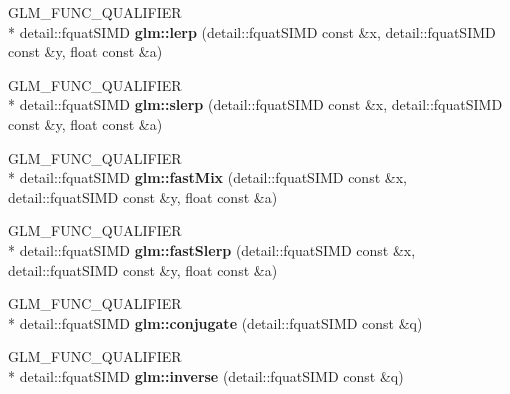 \begin{DoxyCompactItemize}
\item 
\hypertarget{namespaceglm_a4d8cd3fe0165431fb1c54cbeb432bf26}{G\-L\-M\-\_\-\-F\-U\-N\-C\-\_\-\-Q\-U\-A\-L\-I\-F\-I\-E\-R \\*
detail\-::fquat\-S\-I\-M\-D {\bfseries glm\-::lerp} (detail\-::fquat\-S\-I\-M\-D const \&x, detail\-::fquat\-S\-I\-M\-D const \&y, float const \&a)}\label{namespaceglm_a4d8cd3fe0165431fb1c54cbeb432bf26}

\item 
\hypertarget{namespaceglm_a40d5134f42aaa1511518d2abe97e0ebc}{G\-L\-M\-\_\-\-F\-U\-N\-C\-\_\-\-Q\-U\-A\-L\-I\-F\-I\-E\-R \\*
detail\-::fquat\-S\-I\-M\-D {\bfseries glm\-::slerp} (detail\-::fquat\-S\-I\-M\-D const \&x, detail\-::fquat\-S\-I\-M\-D const \&y, float const \&a)}\label{namespaceglm_a40d5134f42aaa1511518d2abe97e0ebc}

\item 
\hypertarget{namespaceglm_acf0fe775efd8a75dc6dc603efd157231}{G\-L\-M\-\_\-\-F\-U\-N\-C\-\_\-\-Q\-U\-A\-L\-I\-F\-I\-E\-R \\*
detail\-::fquat\-S\-I\-M\-D {\bfseries glm\-::fast\-Mix} (detail\-::fquat\-S\-I\-M\-D const \&x, detail\-::fquat\-S\-I\-M\-D const \&y, float const \&a)}\label{namespaceglm_acf0fe775efd8a75dc6dc603efd157231}

\item 
\hypertarget{namespaceglm_a57c9ec50932abd564671a28cd7ba53e0}{G\-L\-M\-\_\-\-F\-U\-N\-C\-\_\-\-Q\-U\-A\-L\-I\-F\-I\-E\-R \\*
detail\-::fquat\-S\-I\-M\-D {\bfseries glm\-::fast\-Slerp} (detail\-::fquat\-S\-I\-M\-D const \&x, detail\-::fquat\-S\-I\-M\-D const \&y, float const \&a)}\label{namespaceglm_a57c9ec50932abd564671a28cd7ba53e0}

\item 
\hypertarget{namespaceglm_a079af2a66c2439c64053382e8c98f213}{G\-L\-M\-\_\-\-F\-U\-N\-C\-\_\-\-Q\-U\-A\-L\-I\-F\-I\-E\-R \\*
detail\-::fquat\-S\-I\-M\-D {\bfseries glm\-::conjugate} (detail\-::fquat\-S\-I\-M\-D const \&q)}\label{namespaceglm_a079af2a66c2439c64053382e8c98f213}

\item 
\hypertarget{namespaceglm_ad723ad1f3ef20438ade0e0c95002f187}{G\-L\-M\-\_\-\-F\-U\-N\-C\-\_\-\-Q\-U\-A\-L\-I\-F\-I\-E\-R \\*
detail\-::fquat\-S\-I\-M\-D {\bfseries glm\-::inverse} (detail\-::fquat\-S\-I\-M\-D const \&q)}\label{namespaceglm_ad723ad1f3ef20438ade0e0c95002f187}


\end{DoxyCompactItemize}

